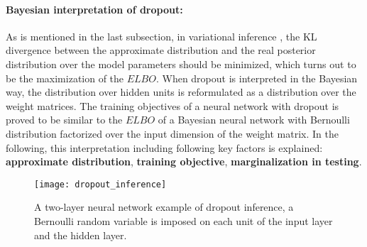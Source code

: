 \paragraph{Bayesian interpretation of dropout:}
As is mentioned in the last subsection, in variational inference , the KL divergence between the approximate distribution and the real posterior distribution over the model parameters should be minimized, which turns out to be the maximization of the $ELBO$. When dropout is interpreted in the Bayesian way, the distribution over hidden units is reformulated as a distribution over the weight matrices. The training objectives of a neural network with dropout is proved to be similar to the $ELBO$ of a Bayesian neural network with Bernoulli distribution factorized over the input dimension of the weight matrix. In the following, this interpretation including following key factors is explained: \textbf{approximate distribution}, \textbf{training objective}, \textbf{marginalization in testing}. 

\begin{figure}[h!]
	\centering
	\texttt{[image: dropout\_inference]}
	\caption{A two-layer neural network example of dropout inference, a Bernoulli random variable is imposed on each unit of the input layer and the hidden layer.}		
	\label{fig:dropout_inference}
\end{figure}

